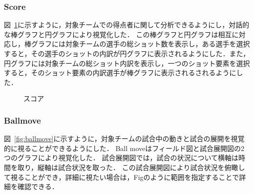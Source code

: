 \documentclass[sotsuron]{kuee}
\begin{document}
			\subsubsection{Score}
				図~\ref{fig:score}に示すように，対象チームでの得点者に関して分析できるようにし，対話的な棒グラフと円グラフにより視覚化した．
				この棒グラフと円グラフは相互に対応し，棒グラフには対象チームの選手の総ショット数を表示し，ある選手を選択すると，その選手のショットの内訳が円グラフに表示されるようにした．また，円グラフには対象チームの総ショット内訳を表示し，一つのショット要素を選択すると，そのショット要素の内訳選手が棒グラフに表示されるされるようにした．
					\begin{figure}
						\begin{center}
						\end{center}
						\caption{スコア}
				  		\label{fig:score}
					\end{figure}
			\subsubsection{Ballmove}
				図~\ref{fig:ballmove}に示すように，対象チームの試合中の動きと試合の展開を視覚的に視ることができるようにした．
				Ball moveはフィールド図と試合展開図の2つのグラフにより視覚化した．
				試合展開図では，試合の状況について横軸は時間を取り，縦軸は試合状況を取った．
				この試合展開図により試合状況を俯瞰して視ることができ，詳細に視たい場合は，Figのように範囲を指定することで詳細を確認できる．
\end{document}
